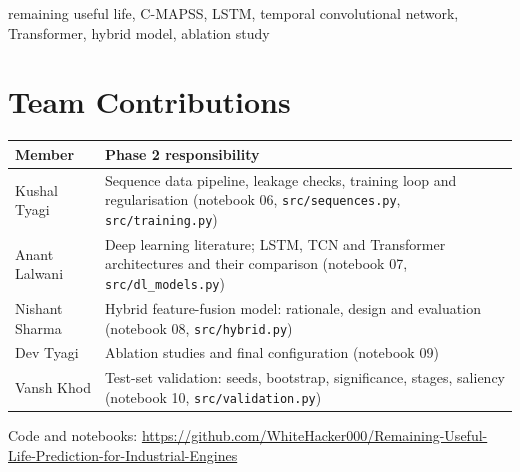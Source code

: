 \documentclass[conference]{IEEEtran}
\begin{document}
\begin{IEEEkeywords}
remaining useful life, C-MAPSS, LSTM, temporal convolutional network, Transformer, hybrid model, ablation study
\end{IEEEkeywords}









\section*{Team Contributions}
{\small
\begin{tabular}{p{}p{}}
\toprule
Member & Phase 2 responsibility \\
\midrule
Kushal Tyagi & Sequence data pipeline, leakage checks, training loop and regularisation (notebook 06, \texttt{src/sequences.py}, \texttt{src/training.py}) \\
Anant Lalwani & Deep learning literature; LSTM, TCN and Transformer architectures and their comparison (notebook 07, \texttt{src/dl\_models.py}) \\
Nishant Sharma & Hybrid feature-fusion model: rationale, design and evaluation (notebook 08, \texttt{src/hybrid.py}) \\
Dev Tyagi & Ablation studies and final configuration (notebook 09) \\
Vansh Khod & Test-set validation: seeds, bootstrap, significance, stages, saliency (notebook 10, \texttt{src/validation.py}) \\
\bottomrule
\end{tabular}}

\vspace{4pt}
\noindent Code and notebooks: \url{https://github.com/WhiteHacker000/Remaining-Useful-Life-Prediction-for-Industrial-Engines}



\end{document}
